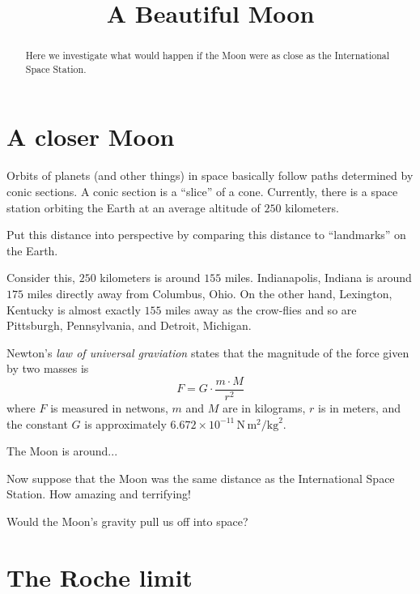 \documentclass{ximera}
\title{A Beautiful Moon}
\begin{document}
\begin{abstract}
Here we investigate what would happen if the Moon were as close as the
International Space Station.
\end{abstract}
\maketitle

\section{A closer Moon}

Orbits of planets (and other things) in space basically follow paths
determined by conic sections. A conic section is a ``slice'' of a
cone. Currently, there is a space station orbiting the Earth at an average
altitude of $250$ kilometers.

\begin{question}
Put this distance into perspective by comparing this distance to
``landmarks'' on the Earth.
\begin{solution}
\begin{freeResponse}
Consider this, $250$ kilometers is around $155$ miles. Indianapolis,
Indiana is around $175$ miles directly away from Columbus, Ohio. On
the other hand, Lexington, Kentucky is almost exactly $155$ miles away
as the crow-flies and so are Pittsburgh, Pennsylvania, and Detroit,
Michigan.
\end{freeResponse}
\end{solution}
\end{question}


Newton's \textit{law of universal graviation} states that the
magnitude of the force given by two masses is
\[
F = G \cdot \frac{m\cdot M}{r^2} 
\]
where $F$ is measured in netwons, $m$ and $M$ are in kilograms, $r$ is
in meters, and the constant $G$ is approximately $6.672\times
10^{-11}\, \mathrm{N}\, \mathrm{m}^2/\mathrm{kg}^2$.

The Moon is around...


Now suppose that the Moon was the same distance as the International
Space Station. How amazing and terrifying!

\begin{question}
Would the Moon's gravity pull us off into space? 
\end{question}

\section{The Roche limit} %
\end{document}
